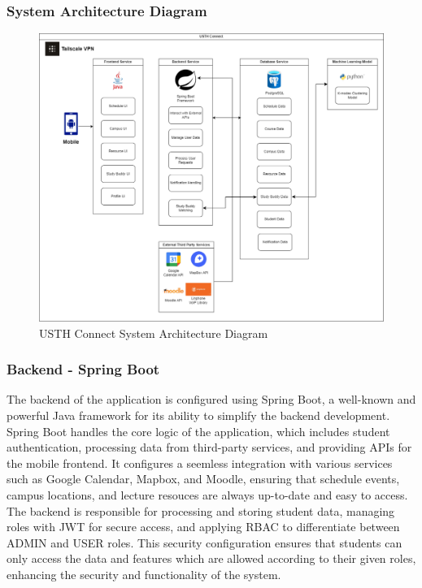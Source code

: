 \documentclass{article}
\begin{document}
\subsubsection{System Architecture Diagram}
\begin{figure}[H]
    \centering
    \includegraphics[width=1\textwidth]{image/USTH-Connect-System-Architecture.pdf} 
    \caption{USTH Connect System Architecture Diagram}
\end{figure}

\subsubsection{Backend - Spring Boot}
The backend of the application is configured using Spring Boot, a well-known and powerful Java framework for its ability to simplify the backend development.
Spring Boot handles the core logic of the application, which includes student authentication, processing data from third-party services, and providing APIs for the mobile frontend.
It configures a seemless integration with various services such as Google Calendar, Mapbox, and Moodle, ensuring that schedule events, campus locations, and lecture resouces are always up-to-date and easy to access.
The backend is responsible for processing and storing student data, managing roles with JWT for secure access, and applying RBAC to differentiate between ADMIN and USER roles.
This security configuration ensures that students can only access the data and features which are allowed according to their given roles, enhancing the security and functionality of the system.
\end{document}
